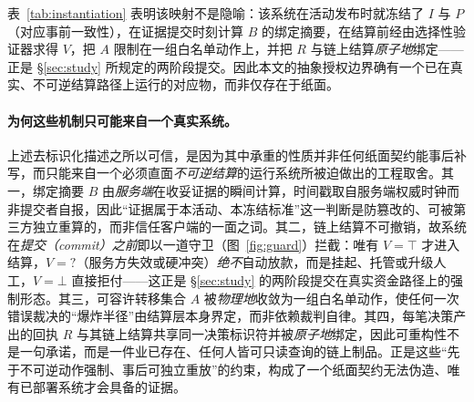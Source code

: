 \documentclass[11pt]{ctexart}
\begin{document}
\begin{table}[t]
\centering
\footnotesize
\caption{把验证契约的六元组 $K=\langle I,P,B,V,A,R\rangle$ 逐字段映射到一个已部署结算环路的真实组件。系统以去标识方式描述；末列给出各字段被冻结或强制的时机，可与图~\ref{fig:guard} 的守卫及 \S\ref{sec:study} 的两阶段提交对照。}
\label{tab:instantiation}
\end{table}

表~\ref{tab:instantiation} 表明该映射不是隐喻：该系统在活动发布时就冻结了 $I$ 与 $P$（对应事前一致性），在证据提交时刻计算 $B$ 的绑定摘要，在结算前经由选择性验证器求得 $V$，把 $A$ 限制在一组白名单动作上，并把 $R$ 与链上结算\emph{原子地}绑定——正是 \S\ref{sec:study} 所规定的两阶段提交。因此本文的抽象授权边界确有一个已在真实、不可逆结算路径上运行的对应物，而非仅存在于纸面。

\paragraph{为何这些机制只可能来自一个真实系统。} 上述去标识化描述之所以可信，是因为其中承重的性质并非任何纸面契约能事后补写，而只能来自一个必须直面\emph{不可逆结算}的运行系统所被迫做出的工程取舍。其一，绑定摘要 $B$ 由\emph{服务端}在收妥证据的瞬间计算，时间戳取自服务端权威时钟而非提交者自报，因此“证据属于本活动、本冻结标准”这一判断是防篡改的、可被第三方独立重算的，而非信任客户端的一面之词。其二，链上结算不可撤销，故系统在\emph{提交（commit）之前}即以一道守卫（图~\ref{fig:guard}）拦截：唯有 $V=\top$ 才进入结算，$V=?$（服务方失效或硬冲突）\emph{绝不}自动放款，而是挂起、托管或升级人工，$V=\bot$ 直接拒付——这正是 \S\ref{sec:study} 的两阶段提交在真实资金路径上的强制形态。其三，可容许转移集合 $A$ 被\emph{物理地}收敛为一组白名单动作，使任何一次错误裁决的“爆炸半径”由结算层本身界定，而非依赖裁判自律。其四，每笔决策产出的回执 $R$ 与其链上结算共享同一决策标识符并被\emph{原子地}绑定，因此可重构性不是一句承诺，而是一件业已存在、任何人皆可只读查询的链上制品。正是这些“先于不可逆动作强制、事后可独立重放”的约束，构成了一个纸面契约无法伪造、唯有已部署系统才会具备的证据。
\end{document}

